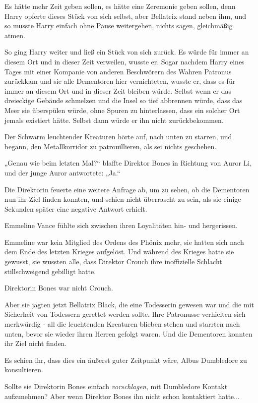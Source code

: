 {Es hätte mehr Zeit geben sollen, es hätte eine Zeremonie geben sollen, denn Harry opferte dieses Stück von sich selbst, aber Bellatrix stand neben ihm, und so musste Harry einfach ohne Pause weitergehen, nichts sagen, gleichmäßig atmen.

So ging Harry weiter und ließ ein Stück von sich zurück. Es würde für immer an diesem Ort und in dieser Zeit verweilen, wusste er. Sogar nachdem Harry eines Tages mit einer Kompanie von anderen Beschwörern des Wahren Patronus zurückkam und sie alle Dementoren hier vernichteten, wusste er, dass es für immer an diesem Ort und in dieser Zeit bleiben würde. Selbst wenn er das dreieckige Gebäude schmelzen und die Insel so tief abbrennen würde, dass das Meer sie überspülen würde, ohne Spuren zu hinterlassen, dass ein solcher Ort jemals existiert hätte. Selbst dann würde er ihn nicht zurückbekommen.

Der Schwarm leuchtender Kreaturen hörte auf, nach unten zu starren, und begann, den Metallkorridor zu patrouillieren, als sei nichts geschehen.

„Genau wie beim letzten Mal?“ blaffte Direktor Bones in Richtung von Auror Li, und der junge Auror antwortete: „Ja.“

Die Direktorin feuerte eine weitere Anfrage ab, um zu sehen, ob die Dementoren nun ihr Ziel finden konnten, und schien nicht überrascht zu sein, als sie einige Sekunden später eine negative Antwort erhielt.

Emmeline Vance fühlte sich zwischen ihren Loyalitäten hin- und hergerissen.

Emmeline war kein Mitglied des Ordens des Phönix mehr, sie hatten sich nach dem Ende des letzten Krieges aufgelöst. Und während des Krieges hatte sie gewusst, sie wussten alle, dass Direktor Crouch ihre inoffizielle Schlacht stillschweigend gebilligt hatte.

Direktorin Bones war nicht Crouch.

Aber sie jagten jetzt Bellatrix Black, die eine Todesserin gewesen war und die mit Sicherheit von Todessern gerettet werden sollte. Ihre Patronusse verhielten sich merkwürdig - all die leuchtenden Kreaturen blieben stehen und starrten nach unten, bevor sie wieder ihren Herren gefolgt waren. Und die Dementoren konnten ihr Ziel nicht finden.

Es schien ihr, dass dies ein äußerst guter Zeitpunkt wäre, Albus Dumbledore zu konsultieren.

Sollte sie Direktorin Bones einfach \emph{vorschlagen}, mit Dumbledore Kontakt aufzunehmen? Aber wenn Direktor Bones ihn nicht schon kontaktiert hatte...

}
